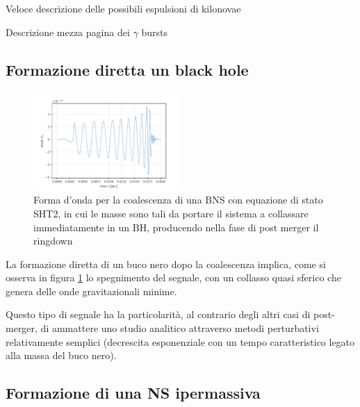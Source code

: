 Veloce descrizione delle possibili espulsioni di kilonovae

Descrizione mezza pagina dei $\gamma$ bursts

\subsection{Formazione diretta un black hole}	
\begin{figure}
	\vspace{-30pt}
	\begin{center}
		\includegraphics[width=0.5\textwidth]{figures/Capitolo_1/SHT2.2.pdf}
	\end{center}
	\vspace{-10pt}
	\caption{Forma d'onda per la coalescenza di una BNS con equazione di stato SHT2, in cui le masse sono tali da portare il sistema a collassare immediatamente in un BH, producendo nella fase di post merger il ringdown}
	\label{fig:FormaOndaBH}
	\vspace{-10pt}
\end{figure}

La formazione diretta di un buco nero dopo la coalescenza implica, come si osserva in figura \ref{fig:FormaOndaBH} lo spegnimento del segnale, con un collasso quasi sferico che genera delle onde gravitazionali minime\cite{sarin2020evolution}.

Questo tipo di segnale ha la particolarità, al contrario degli altri casi di post-merger, di ammattere uno studio analitico attraverso metodi perturbativi relativamente semplici (decrescita esponenziale con un tempo caratteristico legato alla massa del buco nero)\cite{maggiore2018gravitational}.

\subsection{Formazione di una NS ipermassiva}	

